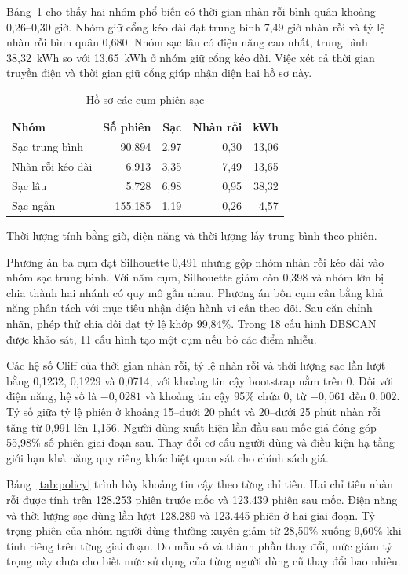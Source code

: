 \documentclass[conference,a4paper]{IEEEtran}
\begin{document}
Bảng~\ref{tab:profiles} cho thấy hai nhóm phổ biến có thời gian nhàn rỗi bình quân khoảng 0,26--0,30 giờ. Nhóm giữ cổng kéo dài đạt trung bình 7,49 giờ nhàn rỗi và tỷ lệ nhàn rỗi bình quân 0,680. Nhóm sạc lâu có điện năng cao nhất, trung bình 38,32~kWh so với 13,65~kWh ở nhóm giữ cổng kéo dài. Việc xét cả thời gian truyền điện và thời gian giữ cổng giúp nhận diện hai hồ sơ này.

\begin{table}[!t]
\caption{Hồ sơ các cụm phiên sạc}
\label{tab:profiles}
\centering\footnotesize
\setlength{\tabcolsep}{3pt}
\begin{tabularx}{\columnwidth}{@{}Xrrrr@{}}
\toprule
\textbf{Nhóm} & \textbf{Số phiên} & \textbf{Sạc} & \textbf{Nhàn rỗi} & \textbf{kWh} \\
\midrule
Sạc trung bình & 90.894 & 2,97 & 0,30 & 13,06 \\
Nhàn rỗi kéo dài & 6.913 & 3,35 & 7,49 & 13,65 \\
Sạc lâu & 5.728 & 6,98 & 0,95 & 38,32 \\
Sạc ngắn & 155.185 & 1,19 & 0,26 & 4,57 \\
\bottomrule
\end{tabularx}
\par\smallskip
\raggedright\scriptsize Thời lượng tính bằng giờ, điện năng và thời lượng lấy trung bình theo phiên.
\end{table}

Phương án ba cụm đạt Silhouette 0,491 nhưng gộp nhóm nhàn rỗi kéo dài vào nhóm sạc trung bình. Với năm cụm, Silhouette giảm còn 0,398 và nhóm lớn bị chia thành hai nhánh có quy mô gần nhau. Phương án bốn cụm cân bằng khả năng phân tách với mục tiêu nhận diện hành vi cần theo dõi. Sau căn chỉnh nhãn, phép thử chia đôi đạt tỷ lệ khớp 99,84\%. Trong 18 cấu hình DBSCAN được khảo sát, 11 cấu hình tạo một cụm nếu bỏ các điểm nhiễu.

Các hệ số Cliff của thời gian nhàn rỗi, tỷ lệ nhàn rỗi và thời lượng sạc lần lượt bằng 0,1232, 0,1229 và 0,0714, với khoảng tin cậy bootstrap nằm trên 0. Đối với điện năng, hệ số là $-0{,}0281$ và khoảng tin cậy 95\% chứa 0, từ $-0{,}061$ đến $0{,}002$. Tỷ số giữa tỷ lệ phiên ở khoảng 15--dưới 20 phút và 20--dưới 25 phút nhàn rỗi tăng từ 0,991 lên 1,156. Người dùng xuất hiện lần đầu sau mốc giá đóng góp 55,98\% số phiên giai đoạn sau. Thay đổi cơ cấu người dùng và điều kiện hạ tầng giới hạn khả năng quy riêng khác biệt quan sát cho chính sách giá.

Bảng~\ref{tab:policy} trình bày khoảng tin cậy theo từng chỉ tiêu. Hai chỉ tiêu nhàn rỗi được tính trên 128.253 phiên trước mốc và 123.439 phiên sau mốc. Điện năng và thời lượng sạc dùng lần lượt 128.289 và 123.445 phiên ở hai giai đoạn. Tỷ trọng phiên của nhóm người dùng thường xuyên giảm từ 28,50\% xuống 9,60\% khi tính riêng trên từng giai đoạn. Do mẫu số và thành phần thay đổi, mức giảm tỷ trọng này chưa cho biết mức sử dụng của từng người dùng cũ thay đổi bao nhiêu.
\end{document}
